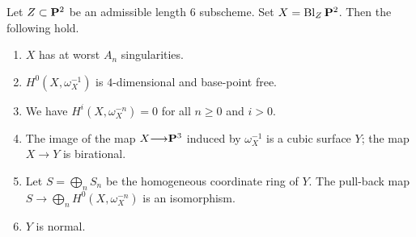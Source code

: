 \documentclass[12pt,reqno]{amsart}
\DeclareMathOperator{\Bl}{Bl}
\renewcommand{\to}{{\longrightarrow}}
\numberwithin{equation}{section}
\begin{document}
\begin{proposition}
  \label{prop:admissibleblowup}
Let $Z \subset \P^2$ be an admissible length 6 subscheme.
Set $X = \Bl_Z\P^2$.
Then the following hold.
\begin{enumerate}
\item $X$ has at worst $A_n$ singularities.
\item $H^0\left(X, \omega^{-1}_X\right)$ is $4$-dimensional and base-point free.
\item We have $H^i(X,\omega_X^{-n}) = 0$ for all $n \geq 0$ and $i > 0$.
\item The image of the map $X \to \P^3$ induced by $\omega_X^{-1}$ is a cubic surface $Y$; the map $X \to Y$ is birational.
\item Let $S = \bigoplus_n S_n$ be the homogeneous coordinate ring of $Y$.
  The pull-back map $S \to \bigoplus_n H^0\left(X, \omega_X^{-n}\right)$ is an isomorphism.
\item $Y$ is normal.
\end{enumerate}
\end{proposition}
\end{document}
